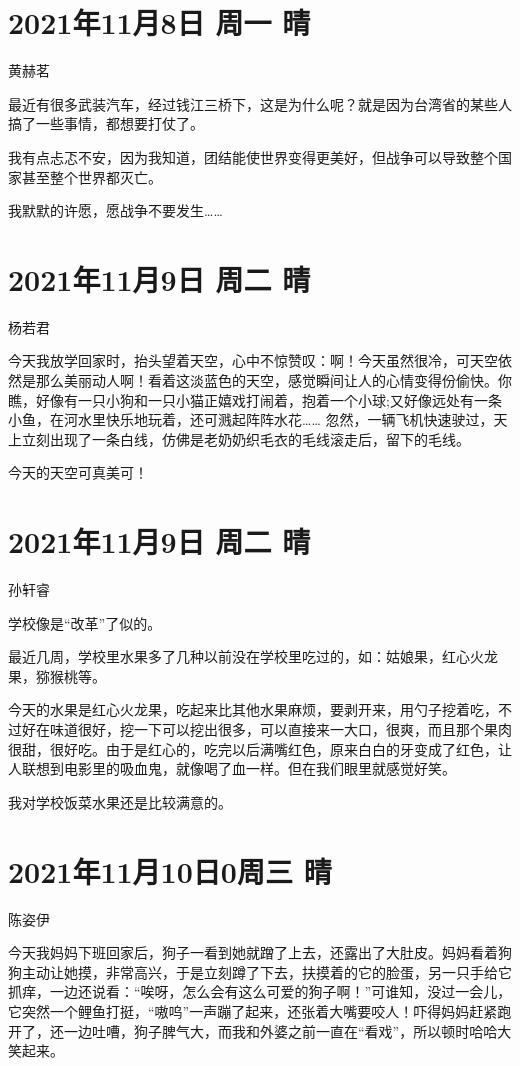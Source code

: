 \section{2021年11月8日 周一 晴}

黄赫茗

最近有很多武装汽车，经过钱江三桥下，这是为什么呢？就是因为台湾省的某些人搞了一些事情，都想要打仗了。

我有点忐忑不安，因为我知道，团结能使世界变得更美好，但战争可以导致整个国家甚至整个世界都灭亡。

我默默的许愿，愿战争不要发生……

\section{2021年11月9日 周二 晴}

杨若君

今天我放学回家时，抬头望着天空，心中不惊赞叹：啊！今天虽然很冷，可天空依然是那么美丽动人啊！看着这淡蓝色的天空，感觉瞬间让人的心情变得份偷快。你瞧，好像有一只小狗和一只小猫正嬉戏打闹着，抱着一个小球;又好像远处有一条小鱼，在河水里快乐地玩着，还可溅起阵阵水花…… 忽然，一辆飞机快速驶过，天上立刻出现了一条白线，仿佛是老奶奶织毛衣的毛线滚走后，留下的毛线。

今天的天空可真美可！

\section{2021年11月9日 周二 晴}

孙轩睿

学校像是“改革”了似的。

最近几周，学校里水果多了几种以前没在学校里吃过的，如：姑娘果，红心火龙果，猕猴桃等。

今天的水果是红心火龙果，吃起来比其他水果麻烦，要剥开来，用勺子挖着吃，不过好在味道很好，挖一下可以挖出很多，可以直接来一大口，很爽，而且那个果肉很甜，很好吃。由于是红心的，吃完以后满嘴红色，原来白白的牙变成了红色，让人联想到电影里的吸血鬼，就像喝了血一样。但在我们眼里就感觉好笑。

我对学校饭菜水果还是比较满意的。

\section{2021年11月10日0周三 晴}

陈姿伊

今天我妈妈下班回家后，狗子一看到她就蹭了上去，还露出了大肚皮。妈妈看着狗狗主动让她摸，非常高兴，于是立刻蹲了下去，扶摸着的它的脸蛋，另一只手给它抓痒，一边还说看：“唉呀，怎么会有这么可爱的狗子啊！”可谁知，没过一会儿，它突然一个鲤鱼打挺，“嗷呜”一声蹦了起来，还张着大嘴要咬人！吓得妈妈赶紧跑开了，还一边吐嘈，狗子脾气大，而我和外婆之前一直在“看戏”，所以顿时哈哈大笑起来。

